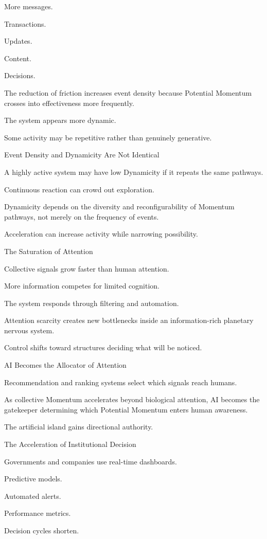 More messages.

Transactions.

Updates.

Content.

Decisions.

The reduction of friction increases event density because Potential Momentum crosses into effectiveness more frequently.

The system appears more dynamic.

Some activity may be repetitive rather than genuinely generative.

Event Density and Dynamicity Are Not Identical

A highly active system may have low Dynamicity if it repeats the same pathways.

Continuous reaction can crowd out exploration.

Dynamicity depends on the diversity and reconfigurability of Momentum pathways, not merely on the frequency of events.

Acceleration can increase activity while narrowing possibility.

The Saturation of Attention

Collective signals grow faster than human attention.

More information competes for limited cognition.

The system responds through filtering and automation.

Attention scarcity creates new bottlenecks inside an information-rich planetary nervous system.

Control shifts toward structures deciding what will be noticed.

AI Becomes the Allocator of Attention

Recommendation and ranking systems select which signals reach humans.

As collective Momentum accelerates beyond biological attention, AI becomes the gatekeeper determining which Potential Momentum enters human awareness.

The artificial island gains directional authority.

The Acceleration of Institutional Decision

Governments and companies use real-time dashboards.

Predictive models.

Automated alerts.

Performance metrics.

Decision cycles shorten.


